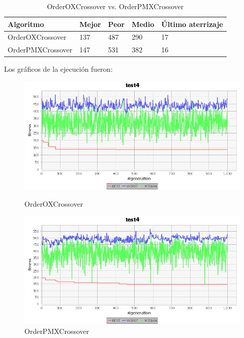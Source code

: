 \documentclass[a4paper,12pt,titlepage]{article}
\begin{document}
\begin{table}[!ht]
\centering
\begin{tabular}{@{}lllll@{}}
\toprule
Algoritmo         & Mejor & Peor & Medio & Último aterrizaje \\ \midrule
OrderOXCrossover  & 137   & 487  & 290   & 17                \\
OrderPMXCrossover & 147   & 531  & 382   & 16                \\ \bottomrule
\end{tabular}
\caption{OrderOXCrossover vs. OrderPMXCrossover}
\end{table}

Los gráficos de la ejecución fueron:

\begin{figure}[!ht]
\centering
\begin{minipage}{.5\textwidth}
  \centering
  \includegraphics[width=\textwidth]{OrderOXCrossover.png}
  \caption{OrderOXCrossover}
\end{minipage}%
\begin{minipage}{.5\textwidth}
  \centering
  \includegraphics[width=\textwidth]{OrderPMXCrossover.png}
  \caption{OrderPMXCrossover}
\end{minipage}
\end{figure}
\end{document}
